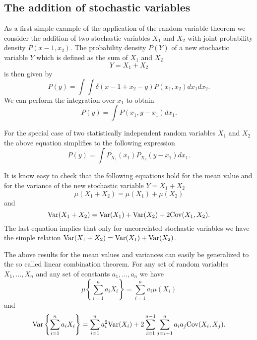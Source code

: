 \subsection{The addition of stochastic variables}
As a first simple example of the application of the random 
variable theorem we consider the addition of two stochastic 
variables $X_1$ and $X_2$ with joint probability density
$P(x-1,x_2)$. The probability density $P(Y) $ of a new stochastic variable
$Y$ which is defined as the sum of $X_1$ and $X_2$ 
\begin{equation}
Y = X_1 + X_2
\end{equation}
is then given by
\begin{equation}
P(y) = \int \int \delta(x-1 +x_2 -y) P(x_1,x_2) dx_1 dx_2.
\end{equation}
We can perform the integration over $x_1$ to obtain
\begin{equation}
P(y) = \int P(x_1,y-x_1) dx_1.
\end{equation}

For the special case of two statistically independent random 
variables $X_1$ and $X_2$ the above equation simplifies to the 
following expression
\begin{equation}
P(y) = \int P_{X_1}(x_1)P_{X_2}(y-x_1) dx_1.
\end{equation}

It is know easy to check that the following equations hold
for the mean value and for the variance of the new stochastic 
variable $Y=X_1 + X_2$
\begin{equation}
\mu(X_1 +X_2) = \mu(X_1) + \mu(X_2)
\end{equation}
and
\begin{equation*}
{\rm Var}(X_1 + X_2) = {\rm Var}(X_1) + {\rm Var}(X_2) +
            2 {\rm Cov}(X_1,X_2).
\end{equation*}
The last equation implies that only for uncorrelated stochastic 
variables we have the simple relation 
${\rm Var}(X_1 + X_2) = {\rm Var}(X_1) + {\rm Var}(X_2)$.

The above results for the mean values and variances can easily be 
generalized to the so called linear combination theorem. For any
set of random variables $X_1, \ldots, X_n$ and any set of 
constants $a_1,\ldots, a_n$ we have
\begin{equation*}
\mu\left\{  \sum_{i=1}^n a_i X_i \right\} =
     \sum_{i=1}^n a_i \mu(X_i) 
\end{equation*}
and
\begin{equation*}
{\rm Var}\left\{  \sum_{i=1}^n a_i X_i \right\} = 
    \sum_{i=1}^n a_i^2 {\rm Var}(X_i) + 
    2 \sum_{i=1}^{n-1} \sum_{j=i+1}^n a_i a_j {\rm Cov}(X_i,X_j).
\end{equation*}



